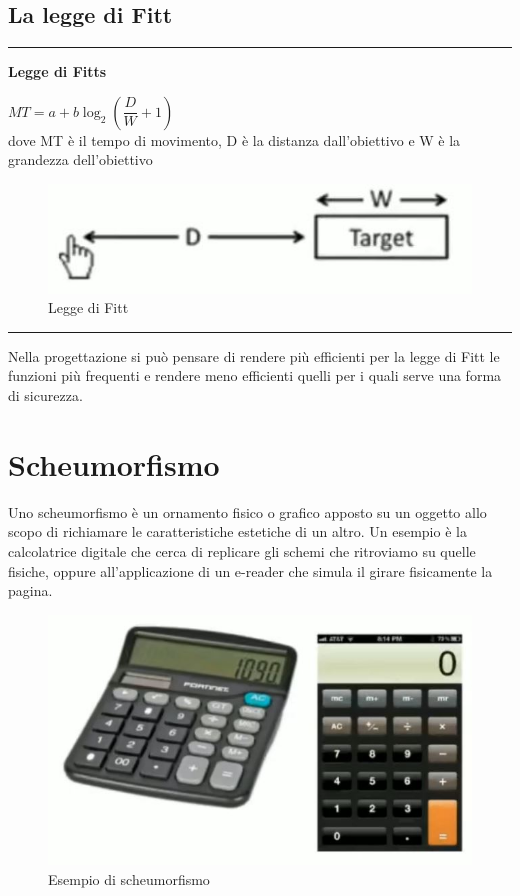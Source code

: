 \documentclass[11pt,a4paper]{book}
\begin{document}
\subsection{La legge di Fitt}
\noindent\rule{\textwidth}{1pt}
\begin{center}
	\textbf{Legge di Fitts}
	
	$MT = a + b\log_{2}(\dfrac{D}{W} + 1)$ \\dove MT è il tempo di movimento, D è la distanza dall'obiettivo e W è la grandezza dell'obiettivo
\end{center}
\begin{figure}[h!]
	\begin{center}
		\includegraphics[scale=0.6]{img/004.jpg}
		\caption{Legge di Fitt}
		\label{fig: 004}
	\end{center}
\end{figure}
\noindent\rule{\textwidth}{1pt}

Nella progettazione si può pensare di rendere più efficienti per la legge di Fitt le funzioni più frequenti e rendere meno efficienti quelli per i quali serve una forma di sicurezza.

\section{Scheumorfismo}
Uno scheumorfismo è un ornamento fisico o grafico apposto su un oggetto allo scopo di richiamare le caratteristiche estetiche di un altro. Un esempio è la calcolatrice digitale che cerca di replicare gli schemi che ritroviamo su quelle fisiche, oppure all'applicazione di un e-reader che simula il girare fisicamente la pagina.

\begin{figure}[h!]
	\begin{center}
		\includegraphics[scale=0.6]{img/005.jpg}
		\caption{Esempio di scheumorfismo}
		\label{fig: 005}
	\end{center}	
\end{figure}
\end{document}
